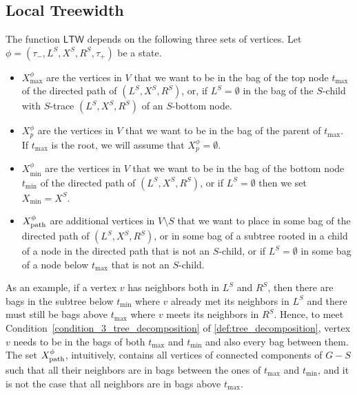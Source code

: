 \documentclass[a4paper,UKenglish,cleveref, autoref, thm-restate, numberwithinsect]{lipics-v2021}
\newcommand{\ltw}{\mathsf{LTW}}
\newcommand{\dpath}{\textup{path}}
\begin{document}
\subsection{Local Treewidth}\label{sec:ltwdef}
The function $\ltw$ depends on the following three sets of vertices.
Let $\phi=(\tau_-,L^S, X^S, R^S,\tau_+)$ be a state. 
\begin{itemize}
    \item $X^\phi_{\max}$ are the vertices in $V$ that we want to be in the bag of the top node $t_{\max}$ of the directed path of $(L^S, X^S, R^S)$, or, if $L^S=\emptyset$ in the bag of the $S$-child with $S$-trace $(L^S, X^S, R^S)$ of an $S$-bottom node.
    \item $X^\phi_p$ are the vertices in $V$ that we want to be in the bag of the parent of $t_{\max}$. If $t_{\max}$ is the root, we will assume that $X^\phi_p=\emptyset$.
    \item $X^\phi_{\min}$ are the vertices in $V$ that we want to be in the bag of the bottom node $t_{\min}$ of the directed path of $(L^S, X^S, R^S)$, or if $L^S=\emptyset$ then we set $X_{\min}=X^S$.
    \item $X^\phi_{\dpath}$ are additional vertices in $V\setminus S$ that we want to place in some bag of the directed path of $(L^S, X^S, R^S)$, or in some bag of a subtree rooted in a child of a node in the directed path that is not an $S$-child, or if $L^S=\emptyset$ in some bag of a node below $t_{\max}$ that is not an $S$-child.
\end{itemize}
As an example, if a vertex $v$ has neighbors both in $L^S$ and $R^S$, then there are bags in the subtree below $t_{\min}$ where $v$ already met its neighbors in $L^S$ and there must still be bags above $t_{\max}$ where $v$ meets its neighbors in $R^S$. Hence, to meet Condition~\ref{condition_3_tree_decomposition} of \cref{def:tree_decomposition}, vertex $v$ needs to be in the bags of both $t_{\max}$ and $t_{\min}$ and also every bag between them. The set $X^\phi_{\dpath}$, intuitively, contains all vertices of connected components of $G-S$ such that all their neighbors are in bags between the ones of $t_{\max}$ and $t_{\min}$, and it is not the case that all neighbors are in bags above $t_{\max}$.
\end{document}
